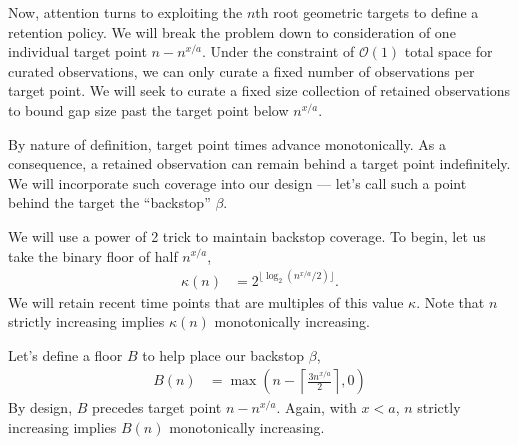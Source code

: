 
Now, attention turns to exploiting the $n$th root geometric targets to define a retention policy.
We will break the problem down to consideration of one individual target point $n - n^{x/a}$.
Under the constraint of $\mathcal{O}(1)$ total space for curated observations, we can only curate a fixed number of observations per target point.
We will seek to curate a fixed size collection of retained observations to bound gap size past the target point below $n^{x/a}$.

By nature of definition, target point times advance monotonically.
As a consequence, a retained observation can remain behind a target point indefinitely.
We will incorporate such coverage into our design --- let's call such a point behind the target the ``backstop'' $\beta$.

We will use a power of 2 trick to maintain backstop coverage.
To begin, let us take the binary floor of half $n^{x/a}$,
\begin{align*}
  \kappa(n)
  &=
  2^{\lfloor \log_{2}(n^{x/a}/2) \rfloor}.
\end{align*}
We will retain recent time points that are multiples of this value $\kappa$.
Note that $n$ strictly increasing implies $\kappa(n)$ monotonically increasing.

Let's define a floor $B$ to help place our backstop $\beta$,
\begin{align*}
  B(n)
  &=
  \max \left(
    n - \left\lceil  \frac{3n^{x/a}}{2} \right\rceil,
    0
  \right)
\end{align*}
By design, $B$ precedes target point $n - n^{x/a}$.
Again, with $x < a$, $n$ strictly increasing implies $B(n)$ monotonically increasing.

